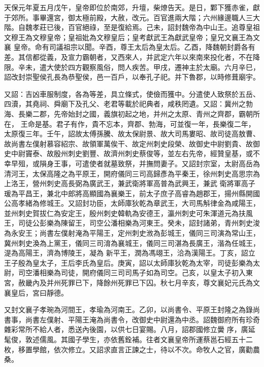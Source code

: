 \begin{pinyinscope}
 天保元年夏五月戊午，皇帝即位於南郊，升壇，柴燎告天。是日，鄴下獲赤雀，獻于郊所。事畢還宮，御太極前殿，大赦，改元。百官進兩大階；六州緣邊職人三大階。自魏孝莊已後，百官絕祿，至是復給焉。己未，詔封魏帝為中山王。追尊皇祖文穆王為文穆皇帝；皇祖妣為文穆皇后；皇考獻武王為獻武皇帝；皇兄文襄王為文襄
 皇帝。命有司議祖宗以聞。辛酉，尊王太后為皇太后。乙酉，降魏朝封爵各有差。其信都從義，及宣力霸朝者，又西來人，并武定六年以來南來投化者，不在降限。辛未，遣大使於四方觀察風俗，問人疾苦。甲戌，遷神主於太廟。六月辛巳，詔改封崇聖侯孔長為恭聖侯，邑一百戶，以奉孔子祀。并下魯郡，以時修葺廟宇。



 又詔：吉凶車服制度，各為等差，具立條式，使儉而獲中。分遣使人致祭於五岳、四瀆，其堯祠、舜廟下及孔父、老君等載於祀典者，咸秩罔遺。又詔：冀州之勃海、長樂二郡，先帝始封之國，義旗初起之地，并州之太原、青州之齊郡，霸朝所在，
 王命是基。君子有作，貴不忘本，齊郡、勃海，可並復一年，長樂復二年，太原復三年。壬午，詔故太傅孫騰、故太保尉景、故大司馬婁昭、故司徒高敖曹、故尚書左僕射慕容紹宗、故領軍萬俟干、故定州刺史段榮、故御史中尉劉貴、故御史中尉竇泰、故殷州刺史劉豐、故濟州刺史蔡俊等，並左右先帝，經贊皇基，或不幸早殂，或隕身王事，可遣使者就墓致祭，并撫問妻子。又詔封宗室，太尉高岳為清河王，太保高隆之為平原王，開府儀同三司高歸彥為平秦王，徐州刺史高思宗為上洛王，營州刺史高長弼為廣武王，兼武衛將軍高普為武興王，兼武
 衛將軍高子瑗為平昌王，兼北中郎將高顯國為襄樂王，前太子庶子高睿為趙郡王，揚州縣開國公高孝緒為修城王。又詔封功臣，太師庫狄乾為章武王，大司馬斛律金為咸陽王，並州刺史賀拔仁為安定王，殷州刺史韓軌為安德王，瀛州刺史可朱渾道元為扶風王，司徒公彭樂為陳留王，司空公潘相樂為河東王。癸未，詔封諸弟，青州刺史浚為永安王；尚書左僕射淹為平陽王，定州刺史浟為彭城王，儀同三司演為常山王，冀州刺史渙為上黨王，儀同三司淯為襄城王，儀同三司湛為長廣王，湝為任城王，湜為高陽王，濟為博陵王，凝為
 新平王，潤為馮翊王，洽為漢陽王。丁亥，詔立王子殷為皇太子，王后李氏為皇后。庚寅，詔以太師庫狄乾為太宰，司徒彭樂為太尉，司空潘相樂為司徒，開府儀同三司司馬子如為司空。己亥，以皇太子初入東宮，赦畿內及并州死罪已下，降餘州死罪已下囚。秋七月辛亥，尊文襄妃元氏為文襄皇后，宮曰靜德。



 又封文襄子孝琬為河間王，孝瑜為河南王。乙卯，以尚書令、平原王封隆之為錄尚書事，尚書左僕射、平陽王淹為尚書令，改御史中尉還為中丞。詔魏御府所有珍奇雜彩常所不給人者，悉送內後園，以供七日宴賜。八月，詔郡國修立黌
 序，廣延髦俊，敦述儒風。其國子學生，亦依舊銓補。往者文襄皇帝所運蔡邕石經五十二枚，移置學館，依次修立。又詔求直言正諫之士，待以不次。命牧人之官，廣勸農桑。




\end{pinyinscope}
